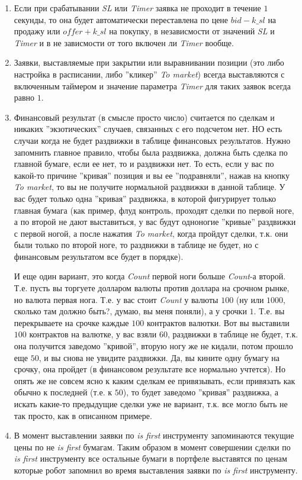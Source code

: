 \begin{enumerate}
	\item Если при срабатывании \textit{SL} или \textit{Timer} заявка не проходит в течение $1$ секунды, то она будет автоматически переставлена по цене $bid - k\_sl$ на продажу или $offer + k\_sl$
		на покупку, в независмости от значений \textit{SL} и \textit{Timer} и в не зависмости от того включен ли \textit{Timer} вообще.
	\item Заявки, выставляемые при закрытии или выравнивании позиции (это либо настройка в расписании, либо ''кликер'' \textit{To market}) всегда выставляются с включенным таймером
		и значение параметра \textit{Timer} для таких заявок всегда равно $1$.
	\item Финансовый результат (в смысле просто число) считается по сделкам и никаких ''экзотических'' случаев, связанных с его подсчетом нет.
		НО есть случаи когда не будет раздвижки в таблице финансовых результатов. Нужно запомнить главное правило, чтобы была раздвижка, должна быть сделка
		по главной бумаге, если ее нет, то и раздвижки нет. То есть, если у вас по какой-то причине ''кривая'' позиция и вы ее ''подравняли'', нажав на кнопку
		\textit{To market}, то вы не получите нормальной раздвижки в данной таблице. У вас будет только одна ''кривая'' раздвижка, в которой фигурирует
		только главная бумага (как пример, флуд контроль, проходят сделки по первой ноге, а по второй не дают выставиться, у вас будут одноногие ''кривые'' раздвижки
		с первой ногой, а после нажатия \textit{To market}, когда пройдут сделки, т.к. они были только по второй ноге, то раздвижки в таблице не будет, но с финансовым
		результатом все будет в порядке).
		
		И еще один вариант, это когда \textit{Count} первой ноги больше \textit{Count}-а второй. Т.е. пусть вы торгуете долларом валюты против доллара на
		срочном рынке, но валюта первая нога. Т.е. у вас стоит \textit{Count} у валюты $100$ (ну или $1000$, сколько там должно быть?, думаю, вы меня поняли),
		а у срочки $1$. Т.е. вы перекрываете на срочке каждые $100$ контрактов валютки. Вот вы выставили $100$ контрактов на валютке, у вас взяли $60$,
		раздвижки в таблице не будет, т.к. она получится заведомо ''кривой'', вторую ногу же не кидали, потом прошло еще $50$, и вы снова не увидите
		раздвижки. Да, вы кините одну бумагу на срочку, она пройдет (в финансовом результате все нормально учтется). Но опять же не совсем ясно к каким
		сделкам ее привязывать, если привязать как обычно к последней (т.е. к $50$), то будет заведомо ''кривая'' раздвижка, а искать какие-то предыдущие
		сделки уже не вариант, т.к. все могло быть не так просто, как в описанном примере.
	\item В момент выставлении заявки по \textit{is first} инструменту запоминаются текущие цены по не \textit{is first} бумагам. Таким образом в момент совершении сделки по \textit{is first} инструменту все остальные бумаги в портфеле выставятся по ценам которые робот запомнил во время выставления заявки по \textit{is first} инструменту.
\end{enumerate}

